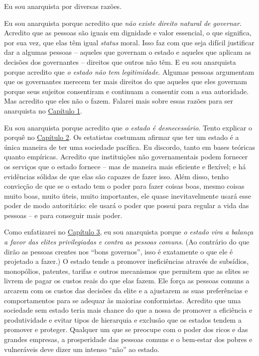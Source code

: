 Eu sou anarquista por diversas razões.

Eu sou anarquista porque acredito que \emph{não existe direito natural de governar}. Acredito que as pessoas são iguais em dignidade e valor essencial, o que significa, por sua vez, que elas têm igual \emph{status} moral. Isso faz com que seja difícil justificar dar a algumas pessoas -- aqueles que governam o estado e aqueles que aplicam as decisões dos governantes -- direitos que outros não têm. E eu sou anarquista porque acredito que \emph{o estado não tem legitimidade}. Algumas pessoas argumentam que os governantes merecem ter mais direitos do que aqueles que eles governam porque seus sujeitos consentiram e continuam a consentir com a sua autoridade. Mas acredito que eles não o fazem. Falarei mais sobre essas razões para ser anarquista no \hyperref[chap:1]{Capítulo 1}.

Eu sou anarquista porque acredito que \emph{o estado é desnecessário}. Tento explicar o porquê no \hyperref[chap:2]{Capítulo 2}. Os estatistas costumam afirmar que ter um estado é a única maneira de ter uma sociedade pacífica. Eu discordo, tanto em bases teóricas quanto empíricas. Acredito que instituições não governamentais podem fornecer os serviços que o estado fornece -- mas de maneira mais eficiente e flexível; e há evidências sólidas de que elas são capazes de fazer isso. Além disso, tenho convicção de que se o estado tem o poder para fazer coisas boas, mesmo coisas muito boas, muito úteis, muito importantes, ele quase inevitavelmente usará esse poder de modo autoritário: ele usará o poder que possui para regular a vida das pessoas -- e para conseguir mais poder.

Como enfatizarei no \hyperref[chap:3]{Capítulo 3}, eu sou anarquista porque \emph{o estado vira a balança a favor das elites privilegiadas e contra as pessoas comuns.} (Ao contrário do que dirão as pessoas crentes nos ``bons governos'', isso é exatamente o que ele é projetado a fazer.) O estado tende a promover ineficiências através de subsídios, monopólios, patentes, tarifas e outros mecanismos que permitem que as elites se livrem de pagar os custos reais do que elas fazem. Ele força as pessoas comuns a arcarem com os custos das decisões da elite e a ajustarem as suas preferências e comportamentos para se adequar às maiorias conformistas. Acredito que uma sociedade sem estado teria mais chance do que a nossa de promover a eficiência e produtividade e evitar tipos de hierarquia e exclusão que os estados tendem a promover e proteger. Qualquer um que se preocupe com o poder dos ricos e das grandes empresas, a prosperidade das pessoas comuns e o bem-estar dos pobres e vulneráveis deve dizer um intenso ``não'' ao estado.

